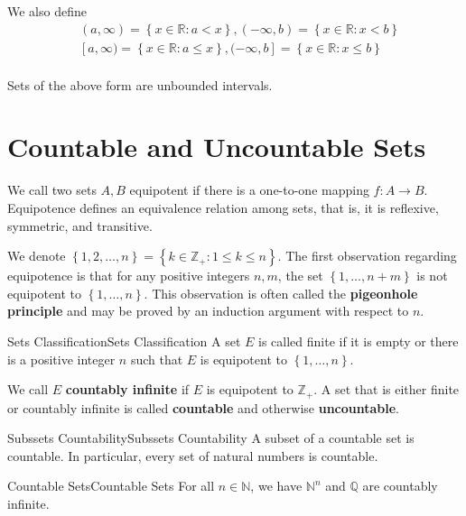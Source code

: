 \documentclass[../main.tex]{subfiles}
\begin{document}
We also define
\begin{equation}
	\begin{aligned}
		 & (a, \infty ) = \left\{ x\in \mathbb{R}: a<x \right\}, (-\infty ,b) = \left\{ x\in \mathbb{R}: x<b \right\}         \\
		 & [a, \infty ) = \left\{ x\in \mathbb{R}: a\leq x \right\}, (-\infty ,b] = \left\{ x\in \mathbb{R}: x\leq b \right\} \\
	\end{aligned}
\end{equation}

Sets of the above form are unbounded intervals.

\section{Countable and Uncountable Sets}
We call two sets $A,B$ equipotent if there is a one-to-one mapping $f:A \rightarrow B$. Equipotence defines an equivalence relation among sets, that is, it is reflexive, symmetric, and transitive.

We denote $\left\{ 1,2, \ldots ,n \right\} = \left\{ k\in \mathbb{Z}_+: 1\leq k\leq n \right\}$. The first observation regarding equipotence is that for any positive integers $n,m$, the set $\left\{ 1, \ldots ,n+m \right\}$ is not equipotent to $\left\{ 1, \ldots ,n \right\}$. This observation is often called the \textbf{pigeonhole principle} and may be proved by an induction argument with respect to $n$.

\begin{definition}{Sets Classification}{Sets Classification}
	A set $E$ is called finite if it is empty or there is a positive integer $n$ such that $E$ is equipotent to $\left\{ 1, \ldots ,n \right\}$.

	We call $E$ \textbf{countably infinite} if $E$ is equipotent to $\mathbb{Z}_+$. A set that is either finite or countably infinite is called \textbf{countable} and otherwise \textbf{uncountable}.
\end{definition}

\begin{proposition}{Subssets Countability}{Subssets Countability}
	A subset of a countable set is countable. In particular, every set of natural numbers is countable.
\end{proposition}

\begin{example}{Countable Sets}{Countable Sets}
	For all $n\in \mathbb{N}$, we have $\mathbb{N}^n$ and $\mathbb{Q}$ are countably infinite.
\end{example}
\end{document}
